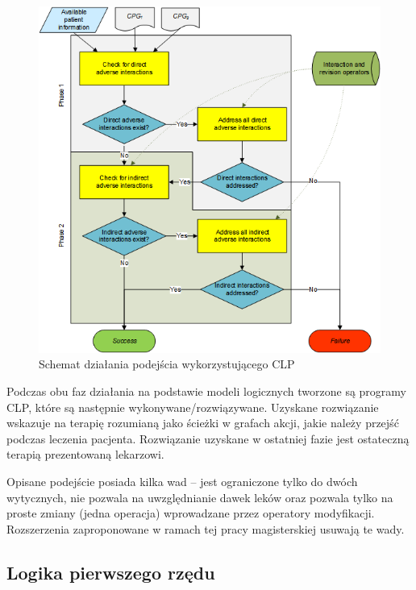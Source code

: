 \begin{figure}
\begin{center}
\includegraphics[scale=0.6]{img/algorytm-clp.png}
\end{center}
\caption{Schemat działania podejścia wykorzystującego CLP \cite{SzWilk2}}
\label{fig:algorytm-clp}
\end{figure}

Podczas obu faz działania na podstawie modeli logicznych tworzone są programy CLP, które są następnie wykonywane/rozwiązywane. Uzyskane rozwiązanie wskazuje na terapię rozumianą jako ścieżki w grafach akcji, jakie należy przejść podczas leczenia pacjenta. Rozwiązanie uzyskane w ostatniej fazie jest ostateczną terapią prezentowaną lekarzowi.

Opisane podejście posiada kilka wad -- jest ograniczone tylko do dwóch wytycznych, nie pozwala na uwzględnianie dawek leków oraz pozwala tylko na proste zmiany (jedna operacja) wprowadzane przez operatory modyfikacji. Rozszerzenia zaproponowane w ramach tej pracy magisterskiej usuwają te wady.



\subsection{Logika pierwszego rzędu}

